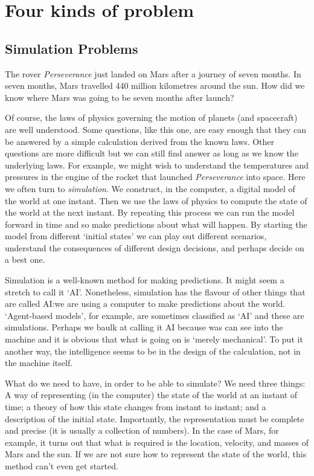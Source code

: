 \documentclass[10pt, a4paper, twocolumn]{article}
\begin{document}
\section{Four kinds of problem}

\subsection{Simulation Problems}

The rover \emph{Perseverance} just landed on Mars after a journey of seven
months. In seven months, Mars travelled 440 million kilometres around the
sun. How did we know where Mars was going to be seven months after launch?

Of course, the laws of physics governing the motion of planets (and spacecraft)
are well understood. Some questions, like this one, are easy enough that they
can be answered by a simple calculation derived from the known laws. Other
questions are more difficult but we can still find answer as long as we know the
underlying laws. For example, we might wish to understand the temperatures and
pressures in the engine of the rocket that launched \emph{Perseverance} into
space. Here we often turn to \emph{simulation}. We construct, in the computer, a
digital model of the world at one instant. Then we use the laws of physics to
compute the state of the world at the next instant. By repeating this process we
can run the model forward in time and so make predictions about what will
happen. By starting the model from different `initial states' we can play out
different scenarios, understand the consequences of different design decisions,
and perhaps decide on a best one.

Simulation is a well-known method for making predictions. It might seem a
stretch to call it `AI'. Nonetheless, simulation has the flavour of other things
that are called AI:\@ we are using a computer to make predictions about the
world. `Agent-based models', for example, are sometimes classified as `AI' and
these are simulations. Perhaps we baulk at calling it AI because was can see into
the machine and it is obvious that what is going on is `merely mechanical'. To
put it another way, the intelligence seems to be in the design of the
calculation, not in the machine itself.

What do we need to have, in order to be able to simulate? We need three things:
A way of representing (in the computer) the state of the world at an instant of
time; a theory of how this state changes from instant to instant; and a
description of the initial state. Importantly, the representation must be
complete and precise (it is usually a collection of numbers). In the case of
Mars, for example, it turns out that what is required is the location, velocity,
and masses of Mars and the sun. If we are not sure how to represent the state of
the world, this method can't even get started.
\end{document}
